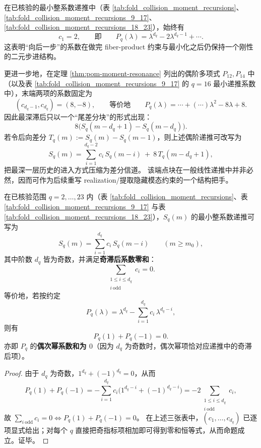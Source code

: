 




\begin{remark}\label{rem:pom-recurrence-endpoint-rigidity}
在已核验的最小整系数递推中（表 \ref{tab:fold_collision_moment_recursions}、\ref{tab:fold_collision_moment_recursions_9_17}、\ref{tab:fold_collision_moment_recursions_18_23}），始终有
\[
c_1=2,
\qquad\text{即}\qquad
P_q(\lambda)=\lambda^{d_q}-2\lambda^{d_q-1}+\cdots.
\]
这表明“向后一步”的系数在做完 fiber-product 约束与最小化之后仍保持一个刚性的二元步进结构。
\par
更进一步地，在定理 \ref{thm:pom-moment-resonance} 列出的偶阶多项式 \(P_{12},P_{14}\) 中（以及表 \ref{tab:fold_collision_moment_recursions_9_17} 的 \(q=16\) 最小递推系数中），末端两项的系数固定为
\[
(c_{d_q-1},c_{d_q})=(8,-8),
\qquad\text{等价地}\qquad
P_q(\lambda)=\cdots+(\cdots)\lambda^2-8\lambda+8.
\]
因此最深滞后只以一个“尾差分块”的形式出现：
\[
8\bigl(S_q(m-d_q+1)-S_q(m-d_q)\bigr).
\]
若令后向差分 \(T_q(m):=S_q(m)-S_q(m-1)\)，则上述偶阶递推可改写为
\[
S_q(m)=\sum_{i=1}^{d_q-2}c_i\,S_q(m-i)\ +\ 8\,T_q(m-d_q+1),
\]
把最深一层历史的进入方式压缩为差分信道。
该端点块在一般线性递推中并非必然，因而可作为后续重写 realization/提取隐藏模态约束的一个结构把手。
\end{remark}

\begin{proposition}\label{prop:pom-moment-odd-lag-neutrality}
在已核验范围 \(q=2,\dots,23\) 内（表 \ref{tab:fold_collision_moment_recursions}、表 \ref{tab:fold_collision_moment_recursions_9_17} 与表 \ref{tab:fold_collision_moment_recursions_18_23}），\(S_q(m)\) 的最小整系数递推可写为
\[
S_q(m)=\sum_{i=1}^{d_q} c_i\,S_q(m-i)\qquad(m\ge m_0),
\]
其中阶数 \(d_q\) 皆为奇数，并满足\textbf{奇滞后系数零和}：
\[
\sum_{\substack{1\le i\le d_q\\ i\ \mathrm{odd}}} c_i=0.
\]
等价地，若按约定
\[
P_q(\lambda)=\lambda^{d_q}-\sum_{i=1}^{d_q}c_i\,\lambda^{d_q-i},
\]
则有
\[
P_q(1)+P_q(-1)=0.
\]
亦即 \(P_q\) 的\textbf{偶次幂系数和为 \(0\)}（因为 \(d_q\) 为奇数时，偶次幂项恰对应递推中的奇滞后项）。
\end{proposition}

\begin{proof}
由于 \(d_q\) 为奇数，\(1^{d_q}+(-1)^{d_q}=0\)，从而
\[
P_q(1)+P_q(-1)
= -\sum_{i=1}^{d_q} c_i\bigl(1^{d_q-i}+(-1)^{d_q-i}\bigr)
= -2\sum_{\substack{1\le i\le d_q\\ i\ \mathrm{odd}}}c_i,
\]
故 \(\sum_{i\ \mathrm{odd}}c_i=0\iff P_q(1)+P_q(-1)=0\)。
在上述三张表中，\((c_1,\dots,c_{d_q})\) 已逐项显式给出；对每个 \(q\) 直接把奇指标项相加即可得到零和恒等式，从而命题成立。证毕。
\end{proof}

